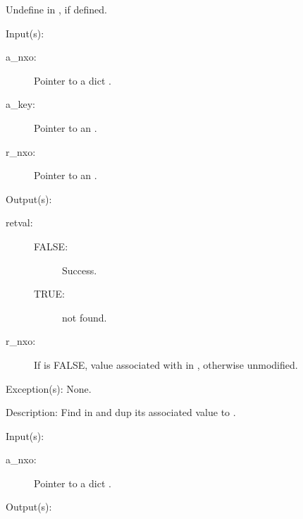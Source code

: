 \begin{capi}
\begin{capilist}
		Undefine  in , if defined.
	\end{capilist}
\label{nxo_dict_lookup}
	\begin{capilist}
	\item[Input(s): ]
		\begin{description}\item[]
		\item[a\_nxo: ]
			Pointer to a dict .
		\item[a\_key: ]
			Pointer to an .
		\item[r\_nxo: ]
			Pointer to an .
		\end{description}
	\item[Output(s): ]
		\begin{description}\item[]
		\item[retval: ]
			\begin{description}\item[]
			\item[FALSE: ]
				Success.
			\item[TRUE: ]
				 not found.
			\end{description}
		\item[r\_nxo: ]
			If  is FALSE, value associated with
			 in , otherwise unmodified.
		\end{description}
	\item[Exception(s): ] None.
	\item[Description: ]
		Find  in  and dup its associated value
		to .
	\end{capilist}
\label{nxo_dict_count}
	\begin{capilist}
	\item[Input(s): ]
		\begin{description}\item[]
		\item[a\_nxo: ]
			Pointer to a dict \classname{nxo}.
		\end{description}
	\item[Output(s): ]
		\begin{description}\item[]

\end{description}
\end{capilist}
\end{capi}
